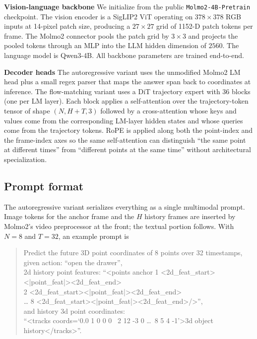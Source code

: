 \documentclass{llmxive}
\begin{document}
\noindent\textbf{Vision-language backbone}
We initialize from the public \texttt{Molmo2-4B-Pretrain} checkpoint. The
vision encoder is a SigLIP2 ViT operating on $378{\times}378$ RGB inputs at
14-pixel patch size, producing a $27{\times}27$ grid of 1152-D patch tokens
per frame. The Molmo2 connector pools the patch grid by $3{\times}3$ and
projects the pooled tokens through an MLP into the LLM hidden dimension of
$2560$. The language model is Qwen3-4B. All backbone parameters are trained
end-to-end.


\noindent\textbf{Decoder heads}
The autoregressive variant uses the unmodified Molmo2 LM head plus a small
regex parser that maps the answer span back to coordinates at inference. The
flow-matching variant uses a DiT trajectory expert with 36 blocks (one per LM
layer). Each block applies a self-attention over the trajectory-token tensor
of shape $(N, H{+}T, 3)$ followed by a cross-attention whose keys and values
come from the corresponding LM-layer hidden states and whose queries come from
the trajectory tokens. RoPE is applied along both the point-index and the
frame-index axes so the same self-attention can distinguish ``the same point
at different times'' from ``different points at the same time'' without
architectural specialization.

\subsection{Prompt format}
\label{appsec:prompt_format}

The autoregressive variant serializes everything as a single multimodal
prompt. Image tokens for the anchor frame and the $H$ history frames are
inserted by Molmo2's video preprocessor at the front; the textual portion
follows. With $N=8$ and $T=32$, an example prompt is

\begin{quote}\small\ttfamily
Predict the future 3D point coordinates of 8 points over 32 timestamps,\\
given action: ``open the drawer'',\\
2d history point features: ``<points anchor 1 <2d\_feat\_start><|point\_feat|><2d\_feat\_end>\\
\hphantom{2d history point features: ``<points anchor }2 <2d\_feat\_start><|point\_feat|><2d\_feat\_end>\\
\hphantom{2d history point features: ``<points anchor }\ldots{} 8 <2d\_feat\_start><|point\_feat|><2d\_feat\_end>/>'',\\
and history 3d point coordinates:\\
\hphantom{and }``<tracks coords=`0.0 1 0 0 0 \ 2 12 -3 0 \ldots\ 8 5 4 -1'>3d object history</tracks>''.
\end{quote}
\end{document}
